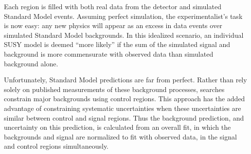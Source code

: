 Each region is filled with both real data from the detector and simulated Standard Model events. Assuming perfect simulation, the experimentalist's task is now easy: any new physics will appear as an excess in data events over simulated Standard Model backgrounds. In this idealized scenario, an individual SUSY model is deemed ``more likely'' if the sum of the simulated signal and background is more commensurate with observed data than simulated background alone.

Unfortunately, Standard Model predictions are far from perfect. Rather than rely solely on published measurements of these background processes, searches constrain major backgrounds using control regions. This approach has the added advantage of constraining systematic uncertainties when these uncertainties are similar between control and signal regions. Thus the background prediction, and uncertainty on this prediction, is calculated from an overall fit, in which the backgrounds and signal are normalized to fit with observed data, in the signal and control regions simultaneously.

